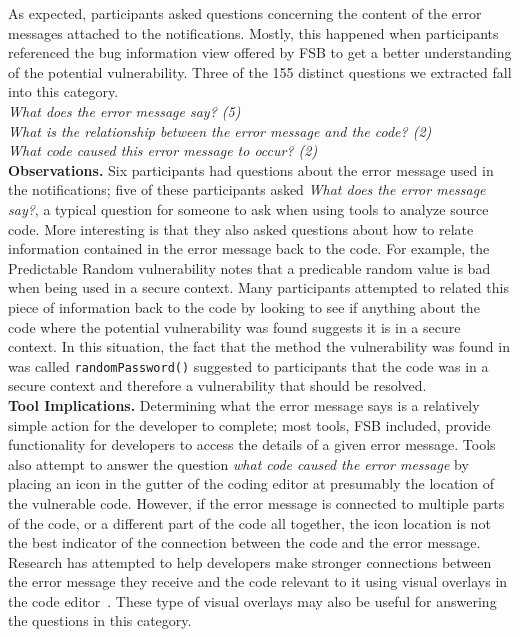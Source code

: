 \documentclass[conference]{IEEEtran}
\begin{document}
As expected, participants asked questions concerning the content of the error messages attached to the notifications. 
Mostly, this happened when participants referenced the bug information view offered by FSB to get a better understanding of the potential vulnerability.
Three of the 155 distinct questions we extracted fall into this category.
\\

\noindent\emph{What does the error message say? (5)} \\
\emph{What is the relationship between the error message and the code? (2)} \\
\emph{What code caused this error message to occur? (2)} \\

\noindent\textbf{Observations.}
Six participants had questions about the error message used in the notifications; five of these participants asked \textit{What does the error message say?}, a typical question for someone to ask when using tools to analyze source code.
More interesting is that they also asked questions about how to relate information contained in the error message back to the code. 
For example, the Predictable Random vulnerability notes that a predicable random value is bad when being used in a secure context. 
Many participants attempted to related this piece of information back to the code by looking to see if anything about the code where the potential vulnerability was found suggests it is in a secure context. 
In this situation, the fact that the method the vulnerability was found in was called \texttt{randomPassword()} suggested to participants that the code was in a secure context and therefore a vulnerability that should be resolved.
\\

\noindent\textbf{Tool Implications.}
Determining what the error message says is a relatively simple action for the developer to complete; most tools, FSB included, provide functionality for developers to access the details of a given error message. 
Tools also attempt to answer the question \emph{what code caused the error message} by placing an icon in the gutter of the coding editor at presumably the location of the vulnerable code. 
However, if the error message is connected to multiple parts of the code, or a different part of the code all together, the icon location is not the best indicator of the connection between the code and the error message. 
Research has attempted to help developers make stronger connections between the error message they receive and the code relevant to it using visual overlays in the code editor~\cite{barik14visual}.
These type of visual overlays may also be useful for answering the questions in this category.
\end{document}

